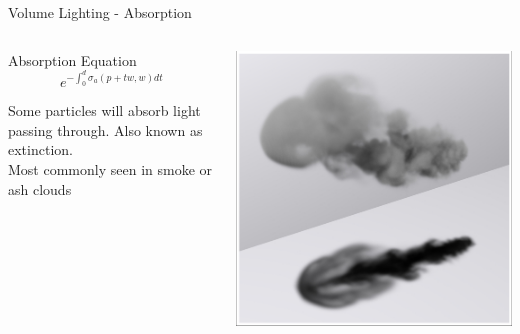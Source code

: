 \documentclass[10pt,compress,professionalfont]{beamer}
\begin{document}
\begin{frame}{Volume Lighting - Absorption}

    \begin{columns}
        \begin{column}{0.55\textwidth}

            \begin{block}{Absorption Equation}
                \[
                    e^{-\int_{0}^{d}\sigma_{a} (p+t\mathit{w},\mathit{w})d\mathit{t}}
                \]
            \end{block}
            \vspace{8mm}
            Some particles will absorb light passing through. Also known as extinction.\\
            \vspace{8mm}
            Most commonly seen in smoke or ash clouds

        \end{column}
        \begin{column}{0.45\textwidth}
            \vspace{10mm}
            \includegraphics[width=\textwidth]{../img/external/scatter}\\
        \end{column}
    \end{columns}

\end{frame}
\end{document}
